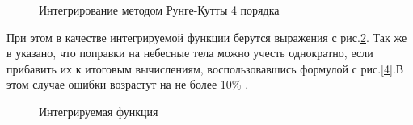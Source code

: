 \documentclass[]{article}
\begin{document}
\begin{figure}[h!]
	
	\caption{Интегрирование методом Рунге-Кутты 4 порядка }
	\label{2}
\end{figure}


При этом в качестве интегрируемой функции берутся выражения с рис.\ref{3}. Так же в \cite{ICD} указано, что поправки на небесные тела можно учесть однократно, если прибавить их к итоговым вычислениям, воспользовавшись формулой с рис.\ref{4}.В этом случае ошибки возрастут на не более 10\% .


\begin{figure}[h!]
	
	\caption{Интегрируемая функция }
	\label{3}
\end{figure}
\end{document}
